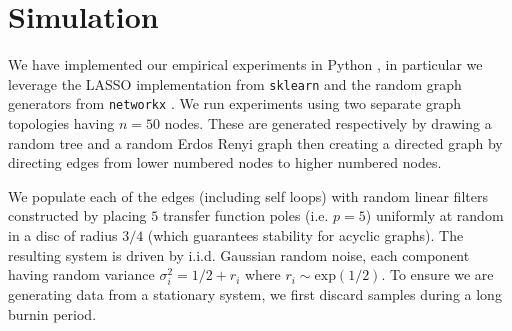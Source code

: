 \documentclass{statsoc}
\DeclarePairedDelimiter{\ceil}{\lceil}{\rceil}  %
\begin{document}
\begin{algorithm}
\end{algorithm}

\section{Simulation}
\label{apx:simulation}
We have implemented our empirical experiments in Python \cite{scipy},
in particular we leverage the LASSO implementation from
\texttt{sklearn} \cite{sklearn} and the random graph generators from
\texttt{networkx} \cite{networkx}.  We run experiments using two
separate graph topologies having $n = 50$ nodes. These are generated
respectively by drawing a random tree and a random Erdos Renyi graph
then creating a directed graph by directing edges from lower numbered
nodes to higher numbered nodes.

We populate each of the edges (including self loops) with random
linear filters constructed by placing $5$ transfer function poles
(i.e. $p = 5$) uniformly at random in a disc of radius $3 / 4$ (which
guarantees stability for acyclic graphs).  The resulting system is
driven by i.i.d. Gaussian random noise, each component having random
variance $\sigma_i^2 = 1/2 + r_i$ where $r_i \sim \text{exp}(1/2)$.  To ensure
we are generating data from a stationary system, we first discard
samples during a long burnin period.
\end{document}
